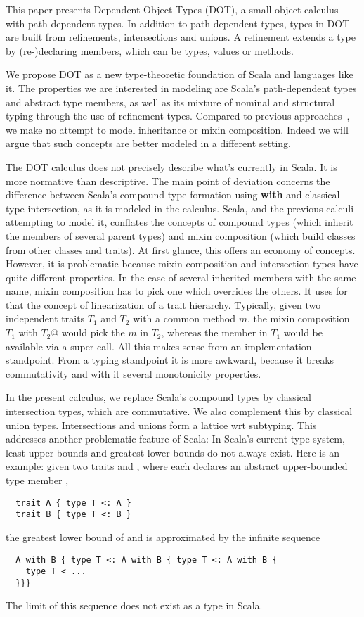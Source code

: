 \documentclass[9pt]{sigplanconf}
\begin{document}
This paper presents Dependent Object Types (DOT), a small object
calculus with path-dependent types. In addition to path-dependent
types, types in DOT are built from refinements, intersections and
unions. A refinement extends a type by (re-)declaring members, which
can be types, values or methods.

We propose DOT as a new type-theoretic foundation of Scala and
languages like it. The properties we are interested in modeling are
Scala's path-dependent types and abstract type members, as well as its
mixture of nominal and structural typing through the use of refinement
types. Compared to previous approaches~\cite{nuObj,FS}, we make no
attempt to model inheritance or mixin composition. Indeed we will
argue that such concepts are better modeled in a different setting.

The DOT calculus does not precisely describe what's currently in Scala. It
is more normative than descriptive. The main point of deviation
concerns the difference between Scala's compound type formation using
{\bf with} and classical type intersection, as it is modeled in the
calculus. Scala, and the previous calculi attempting to model it,
conflates the concepts of compound types (which inherit the members of
several parent types) and mixin composition (which build classes from
other classes and traits). At first glance, this offers an economy of
concepts. However, it is problematic because mixin composition and
intersection types have quite different properties. In the case of
several inherited members with the same name, mixin composition has to
pick one which overrides the others. It uses for that the concept of
linearization of a trait hierarchy. Typically, given two independent
traits $T_1$ and $T_2$ with a common method $m$, the mixin composition
\code@$T_1$ with $T_2$@ would pick the $m$ in $T_2$, whereas the member in
$T_1$ would be available via a super-call. All this makes sense from
an implementation standpoint. From a typing standpoint it is more
awkward, because it breaks commutativity and with it several
monotonicity properties.

In the present calculus, we replace Scala's compound types by
classical intersection types, which are commutative. We also
complement this by classical union types. Intersections and unions
form a lattice wrt subtyping. This addresses another problematic
feature of Scala: In Scala's current type system, least upper bounds
and greatest lower bounds do not always exist. Here is an example:
given two traits  and , where each declares an
abstract upper-bounded type member ,
\begin{lstlisting}
  trait A { type T <: A }
  trait B { type T <: B }
\end{lstlisting}
the greatest lower bound of  and  is approximated by the
infinite sequence
\begin{lstlisting}
  A with B { type T <: A with B { type T <: A with B {
    type T < ...
  }}}
\end{lstlisting}
The limit of this sequence does not exist as a type in Scala.
\end{document}
